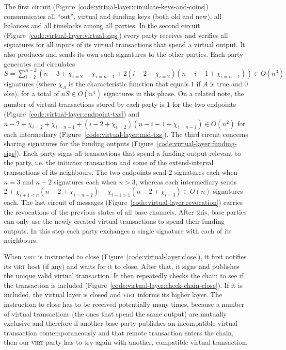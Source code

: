   The first circuit (Figure~\ref{code:virtual-layer:circulate-keys-and-coins})
  communicates all ``out'', virtual and funding keys (both old and new), all
  balances and all timelocks among all parties. In the second circuit
  (Figure~\ref{code:virtual-layer:virtual-sigs}) every party receives and
  verifies all signatures for all inputs of its virtual transactions that spend
  a virtual output. It also produces and sends its own such signatures to the
  other parties. Each party generates and circulates $S = \sum\limits_{i =
  2}^{n-2} (n-3 + \chi_{i = 2} + \chi_{i = n - 1} + 2(i - 2 + \chi_{i = 2})(n -
  i - 1 + \chi_{i = n - 1})) \in O(n^3)$ signatures (where $\chi_A$ is the
  characteristic function that equals $1$ if $A$ is true and $0$ else), for a
  total of $nS \in O(n^4)$ signatures in this phase. On a related note, the
  number of virtual transactions stored by each party is $1$ for the two
  endpoints (Figure~\ref{code:virtual-layer:endpoint-txs}) and $n - 2 + \chi_{i
  = 2} + \chi_{i = n - 1} +  (i - 2 + \chi_{i = 2}) (n - i - 1 + \chi_{i = n-1})
  \in O(n^2)$ for each intermediary (Figure~\ref{code:virtual-layer:mid-txs}).
  The third circuit concerns sharing signatures for the funding outputs
  (Figure~\ref{code:virtual-layer:funding-sigs}). Each party signs all
  transactions that spend a funding output relevant to the party, i.e. the
  initiator transaction and some of the extend-interval transactions of its
  neighbours. The two endpoints send $2$ signatures each when $n = 3$ and $n -
  2$ signatures each when $n > 3$, whereas each intermediary sends $2 + \chi_{i
  + 1 < n}(n - 2 + \chi_{i = n - 2}) + \chi_{i - 1 > 1}(n - 2 + \chi_{i = 3})
  \in O(n)$ signatures each. The last circuit of messages
  (Figure~\ref{code:virtual-layer:revocation}) carries the revocations of the
  previous states of all base channels. After this, base parties can only use
  the newly created virtual transactions to spend their funding outputs. In this
  step each party exchanges a single signature with each of its neighbours.

  When \textsc{virt} is instructed to close
  (Figure~\ref{code:virtual-layer:close}), it first notifies its \textsc{virt}
  host (if any) and waits for it to close. After that, it signs and publishes
  the unique valid virtual transaction. It then repeatedly checks the chain to
  see if the transaction is included
  (Figure~\ref{code:virtual-layer:check-chain-close}). If it is included, the
  virtual layer is closed and \textsc{virt} informs its higher layer. The
  instruction to close has to be received potentially many times, because a
  number of virtual transactions (the ones that spend the same output) are
  mutually exclusive and therefore if another base party publishes an
  incompatible virtual transaction contemporaneously and that remote transaction
  enters the chain, then our \textsc{virt} party has to try again with another,
  compatible virtual transaction.
